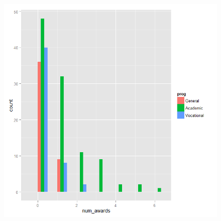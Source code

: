 \documentclass[00-GLMregslides.tex]{subfiles}
\begin{document}
%
%
%
%
%
		
%

\begin{frame}
	\begin{figure}
\centering
\includegraphics[width=0.8\linewidth]{poisson1}
\caption{}
\label{fig:poisson1}
\end{figure}

	
\end{frame}
\end{document}
